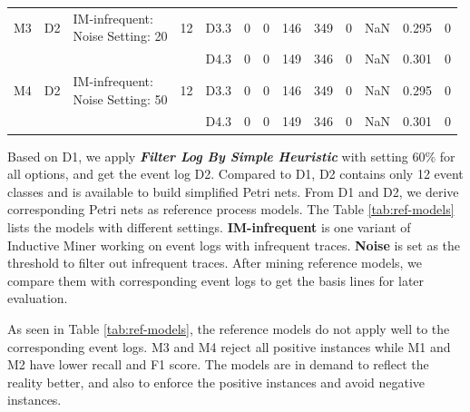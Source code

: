 \begin{table}[htp]
{\begin{tabular}{|llll|lllllllll|}
		M3                                                                      & D2                                                                        & \makecell[l]{IM-infrequent: \\ Noise Setting: 20} & 12                                                                         &D3.3 &  0  & 0   & 146   & 349   & 0       &NaN           &    0.295      & 0   \\
		
		&                                                                      & &                                                                          & D4.3 &  0  & 0   & 149   & 346   & 0       & NaN           &  0.301        &0    \\
		\hline 
		
		M4                                                                      & D2                                                                        & \makecell[l]{IM-infrequent: \\ Noise Setting: 50} & 12                                                                         &D3.3 &  0  &  0  &  146  & 349   & 0       & NaN           &     0.295     & 0\\   
		&                                                                      & &                                                                          & D4.3 &  0  & 0   & 149   & 346   & 0       & NaN           &  0.301        &0    \\
		
		\hline
	\end{tabular}
 }
\end{table}
Based on D1, we apply \textbf{\emph{Filter Log By Simple Heuristic}} with setting 60\% for all options, and get the event log D2. Compared to D1, D2 contains only 12 event classes and is available to build simplified Petri nets. 
From D1 and D2, we derive corresponding Petri nets as reference process models. The Table \ref{tab:ref-models} lists the models with different settings. \textbf{IM-infrequent} is one variant of Inductive Miner working on event logs with infrequent traces. \textbf{Noise} is set as the threshold to filter out infrequent traces. After mining reference models, we compare them with  corresponding event logs to get the basis lines for later evaluation.

As seen in Table \ref{tab:ref-models}, the reference models do not apply well to the corresponding event logs. M3 and M4 reject all positive instances while M1 and M2 have lower recall and F1 score.  The models are in demand to reflect the reality better, and also to enforce the positive instances and avoid negative instances. 
